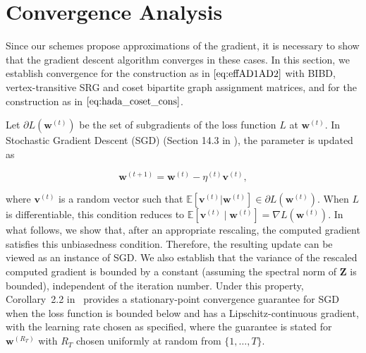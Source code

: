 \documentclass[journal,draftcls,onecolumn]{IEEEtran}
\theoremstyle{mystyle}
\newcommand{\bfZ}{\mathbf{Z}}
\newcommand{\bfB}{\mathbf{B}}
\newcommand{\floor}[1]{\left\lfloor #1\right\rfloor}
\newcommand{\aditya}[1]{\marginpar{+}{\bf Aditya's remark}: {\em #1}}
\begin{document}









\section{Convergence Analysis}
\label{sec:convergence}
Since our schemes propose approximations of the gradient, it is necessary to show that the gradient descent algorithm converges in these cases. In this section, we establish convergence for the construction as in $\eqref{eq:effAD1AD2}$ with BIBD, vertex-transitive SRG and coset bipartite graph assignment matrices, and for the construction as in $\eqref{eq:hada_coset_cons}$.

Let $\partial L(\mathbf{w}^{(t)})$ be the set of subgradients of the loss function $L$ at $\mathbf{w}^{(t)}$. In Stochastic Gradient Descent (SGD) (Section 14.3 in \cite{books/daglib/0033642}), the parameter is updated as 

\[ \mathbf{w}^{(t+1)} = \mathbf{w}^{(t)} - \eta^{(t)} {\mathbf{v}}^{(t)},\]

where $\mathbf{v}^{(t)}$ is a random vector such that $\mathbb{E}[ \mathbf{v}^{(t)} | \mathbf{w}^{(t)}] \in \partial L (\mathbf{w}^{(t)})$. When $L$ is differentiable, this condition reduces to $\mathbb{E}\!\left[\mathbf{v}^{(t)} \mid \mathbf{w}^{(t)}\right]
=
\nabla L\!\left(\mathbf{w}^{(t)}\right)$. In what follows, we show that, after an appropriate rescaling, the computed gradient satisfies this unbiasedness condition. Therefore, the resulting update can be viewed as an instance of SGD. We also establish that the variance of the rescaled computed gradient is bounded by a constant (assuming the spectral norm of $\bfZ$ is bounded), independent of the iteration number. Under this property, Corollary~2.2 in~\cite{doi:10.1137/120880811} provides a stationary-point convergence guarantee for SGD when the loss function is bounded below and has a Lipschitz-continuous gradient, with the learning rate chosen as specified, where the guarantee is stated for $\mathbf{w}^{(R_T)}$ with $R_T$ chosen uniformly at random from $\{1,\ldots,T\}$.
\end{document}
